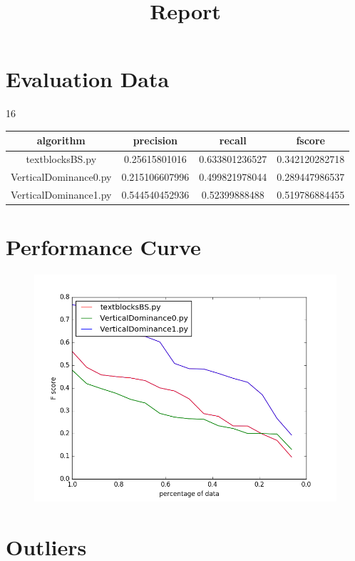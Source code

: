 \documentclass[a4paper,10pt]{article}
\begin{document}
\title{Report}
\maketitle
\section*{Evaluation Data}
16
 
				\begin{table}[htbp]
				\centering
				\begin{tabular}{|c|c|c|c|}
				\hline
				algorithm&precision&recall&fscore\\
				\hline
				textblocksBS.py&0.25615801016&0.633801236527&0.342120282718\\
VerticalDominance0.py&0.215106607996&0.499821978044&0.289447986537\\
VerticalDominance1.py&0.544540452936&0.52399888488&0.519786884455\\

				\hline
				\end{tabular}
				\end{table}
				 
\section*{Performance Curve}
\begin{figure}[!htbp]
\centering
\includegraphics[width = 15cm]{performance.png} 
\end{figure}
\section*{Outliers}
\end{document}
